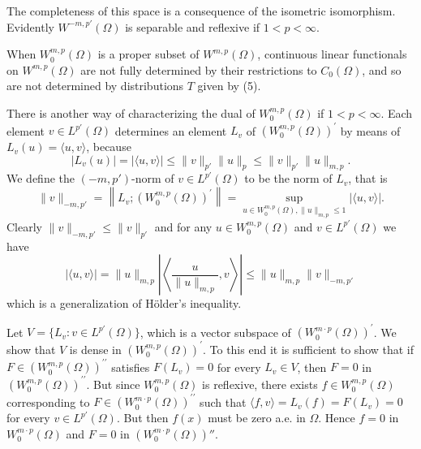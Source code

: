 The completeness of this space is a consequence of the isometric isomorphism. Evidently $W^{-m, p'}(\Omega)$ is separable and reflexive if $1<p<\infty$.

When $W_0^{m, p}(\Omega)$ is a proper subset of $W^{m, p}(\Omega)$, continuous linear functionals on $W^{m, p}(\Omega)$ are not fully determined by their restrictions to $C_0(\Omega)$, and so are not determined by distributions $T$ given by (5).


\begin{para}
  There is another way of characterizing the dual of $W_0^{m, p}(\Omega)$ if $1<p<\infty$.
  Each element $v \in L^{p'}(\Omega)$ determines an element $L_v$
  of $\left(W_0^{m, p}(\Omega)\right)^{\prime}$ by means of $L_v(u)=\langle u, v\rangle$,
  because
  \[
  \left|L_v(u)\right|=|\langle u, v\rangle| \leq\|v\|_{p'}\|u\|_p \leq\|v\|_{p'}\|u\|_{m, p} .
  \]
  We define the $\left(-m, p'\right)$-norm of $v \in L^{p'}(\Omega)$ to be the norm of $L_v$, that is
  \[
  \|v\|_{-m, p'}
    = \left\|L_v ;\left(W_0^{m, p}(\Omega)\right)^{\prime}\right\|
    = \sup_{u \in W_0^{m, p}(\Omega),\|u\|_{m, p} \leq 1}|\langle u, v\rangle| .
  \]
  Clearly $\|v\|_{-m, p'} \leq\|v\|_{p'}$ and for any $u \in W_0^{m, p}(\Omega)$ and $v \in L^{p'}(\Omega)$ we have
  \begin{equation}\label{eq:3.6}
  |\langle u, v\rangle|=\|u\|_{m, p}\left|\left\langle\frac{u}{\|u\|_{m, p}}, v\right\rangle\right| \leq\|u\|_{m, p}\|v\|_{-m, p'}
  \end{equation}
  which is a generalization of Hölder's inequality.

  Let $V = \{L_v: v \in L^{p'}(\Omega)\}$, which is a vector subspace of
  $\left(W_0^{m \cdot p}(\Omega)\right)^{\prime}$.
  We show that $V$ is dense in $\left(W_0^{m, p}(\Omega)\right)^{\prime}$.
  To this end it is sufficient to show that if
  $F \in\left(W_0^{m, p}(\Omega)\right)^{\prime \prime}$ satisfies $F\left(L_v\right)=0$
  for every $L_v \in V$, then $F=0$ in $\left(W_0^{m, p}(\Omega)\right)^{\prime \prime}$.
  But since $W_0^{m, p}(\Omega)$ is reflexive, there exists $f \in W_0^{m, p}(\Omega)$ corresponding to $F \in\left(W_0^{m \cdot p}(\Omega)\right)^{\prime \prime}$
  such that $\langle f, v\rangle=L_v(f)=F\left(L_v\right)=0$ for every $v \in L^{p'}(\Omega)$.
  But then $f(x)$ must be zero a.e. in $\Omega$. Hence $f=0$ in $W_0^{m \cdot p}(\Omega)$ and 
  $F=0$ in $(W_0^{m \cdot p}(\Omega))''$.
  

\end{para}
